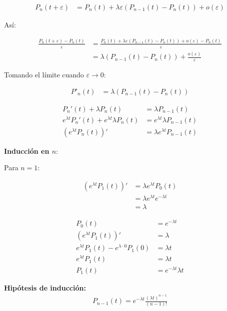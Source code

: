 \documentclass[12pt,a4paper]{article}
\begin{document}
\begin{align*}
P_n(t+\varepsilon) &= P_n(t) + \lambda \varepsilon (P_{n-1}(t) - P_n(t)) + o(\varepsilon)
\end{align*}

Así:

\begin{align*}
\frac{P_n(t+\varepsilon) - P_n(t)}{\varepsilon} 
&= \frac{P_n(t) + \lambda \varepsilon (P_{n-1}(t) - P_n(t)) + o(\varepsilon) - P_n(t)}{\varepsilon} \\
&= \lambda (P_{n-1}(t) - P_n(t)) + \frac{o(\varepsilon)}{\varepsilon}
\end{align*}

Tomando el límite cuando $\varepsilon \to 0$:

\begin{align*}
P'_n(t) &= \lambda (P_{n-1}(t) - P_n(t))
\end{align*}

\begin{align*}
P_n'(t) + \lambda P_n(t) &= \lambda P_{n-1}(t) \\
e^{\lambda t} P_n'(t) + e^{\lambda t} \lambda P_n(t) &= e^{\lambda t} \lambda P_{n-1}(t) \\
\left(e^{\lambda t} P_n(t)\right)' &= \lambda e^{\lambda t} P_{n-1}(t)
\end{align*}

\textbf{Inducción en $n$}:

Para $n=1$:

\begin{align*}
\left(e^{\lambda t} P_1(t)\right)' &= \lambda e^{\lambda t} P_0(t) \\
                                   &= \lambda e^{\lambda t} e^{-\lambda t} \\
                                   &= \lambda
\end{align*}

\begin{align*}
P_0(t) &= e^{-\lambda t} \\
\left(e^{\lambda t} P_1(t)\right)' &= \lambda \\
e^{\lambda t} P_1(t) - e^{\lambda \cdot 0} P_1(0) &= \lambda t \\
e^{\lambda t} P_1(t) &= \lambda t \\
P_1(t) &= e^{-\lambda t} \lambda t
\end{align*}

\textbf{Hipótesis de inducción:}
\begin{align*}
P_{n-1}(t) = e^{-\lambda t} \frac{(\lambda t)^{n-1}}{(n-1)!}
\end{align*}
\end{document}
